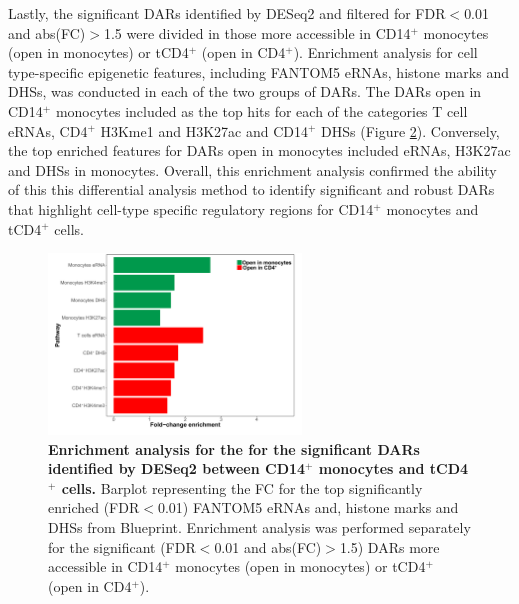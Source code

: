 \begin{figure}[htbp]
\label{figure:QC_quantile_DAR_and_DESeq2_comparison}
\end{figure} 

Lastly, the significant  DARs identified by DESeq2 and filtered for FDR$<$0.01 and abs(FC)$>$1.5 were divided in those more accessible in CD14$^+$ monocytes  (open in monocytes) or tCD4$^+$ (open in CD4$^+$). Enrichment analysis for cell type-specific epigenetic features, including FANTOM5 eRNAs, histone marks and DHSs, was conducted in each of the two groups of DARs. The DARs open in CD14$^+$ monocytes included as the top hits for each of the categories T cell eRNAs, CD4$^+$ H3Kme1 and H3K27ac and CD14$^+$ DHSs (Figure \ref{figure:Enrichment_analysis_of_DARs_by_DESeq2}). Conversely, the top enriched features for DARs open in monocytes included eRNAs, H3K27ac and DHSs in monocytes. Overall, this enrichment analysis confirmed the ability of this this differential analysis method to identify significant and robust DARs that highlight cell-type specific regulatory regions for CD14$^+$ monocytes and tCD4$^+$ cells.


\begin{figure}[htbp]
\centering
\includegraphics[width=0.6\textwidth]{./Results1/pdfs/ATAC_CD4vsCD14_deseq_features_enrichment_barplot}
\caption[Enrichment analysis for the significant DARs identified by DESeq2 between CD14$^+$ monocytes and tCD4$^+$ cells.]{\textbf{Enrichment analysis for the for the significant DARs identified by DESeq2 between CD14$^+$ monocytes and tCD4$^+$ cells.} Barplot representing the FC for the top significantly enriched (FDR$<$0.01) FANTOM5 eRNAs and, histone marks and DHSs from Blueprint. Enrichment analysis was performed separately for the significant (FDR$<$0.01 and abs(FC)$>$1.5) DARs more accessible in CD14$^+$ monocytes (open in monocytes) or tCD4$^+$ (open in CD4$^+$).}
\label{figure:Enrichment_analysis_of_DARs_by_DESeq2}
\end{figure} 

